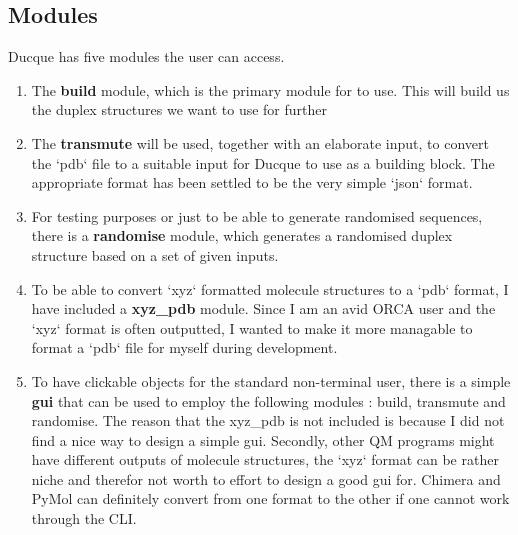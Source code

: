 \subsection{Modules}
Ducque has five modules the user can access.
\begin{enumerate}[leftmargin=*]
    \setlength\itemsep{-1.5mm}
    \item The \textbf{build} module, which is the primary module for to use. This will build us the duplex structures we want to use for further 
    \item The \textbf{transmute} will be used, together with an elaborate input, to convert the `pdb` file to a suitable input for Ducque to use as a building block.
        The appropriate format has been settled to be the very simple `json` format.
    \item For testing purposes or just to be able to generate randomised sequences, there is a \textbf{randomise} module, which generates a randomised duplex structure based on a set of given inputs.
    \item To be able to convert `xyz` formatted molecule structures to a `pdb` format, I have included a \textbf{xyz\_pdb} module. Since I am an avid ORCA user and the `xyz` format is often outputted, I wanted to make it more managable to format a `pdb` file for myself during development.
    \item To have clickable objects for the standard non-terminal user, there is a simple \textbf{gui} that can be used to employ the following modules : build, transmute and randomise. The reason that the xyz\_pdb is not included is because I did not find a nice way to design a simple gui. Secondly, other QM programs might have different outputs of molecule structures, the `xyz` format can be rather niche and therefor not worth to effort to design a good gui for. Chimera and PyMol can definitely convert from one format to the other if one cannot work through the CLI.
\end{enumerate}
